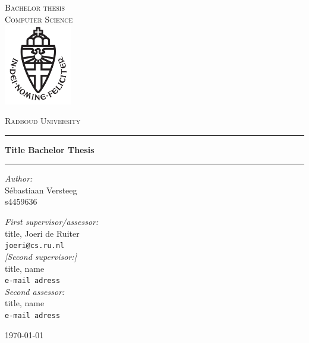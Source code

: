 \documentclass[11pt,a4paper]{report}
\begin{document}
\begin{titlepage}
\begin{center}
\textsc{\LARGE Bachelor thesis\\Computer Science}\\[1.5cm]
\includegraphics[height=100pt]{logo}

\vspace{0.4cm}
\textsc{\Large Radboud University}\\[1cm]
\hrule
\vspace{0.4cm}
\textbf{\huge Title Bachelor Thesis}\\[0.4cm]
\hrule
\vspace{2cm}
\begin{minipage}[t]{0.45\textwidth}
\begin{flushleft} \large
\textit{Author:}\\
S\'ebastiaan Versteeg\\
s4459636
\end{flushleft}
\end{minipage}
\begin{minipage}[t]{0.45\textwidth}
\begin{flushright} \large
\textit{First supervisor/assessor:}\\
title, Joeri de Ruiter\\
\texttt{joeri@cs.ru.nl}\\[1.3cm]
\textit{[Second supervisor:]}\\
title, name\\
\texttt{e-mail adress}\\[1.3cm]
\textit{Second assessor:}\\
title, name\\
\texttt{e-mail adress}
\end{flushright}
\end{minipage}
\vfill
{\large \today}
\end{center}
\end{titlepage}



\tableofcontents










\appendix

\end{document}
